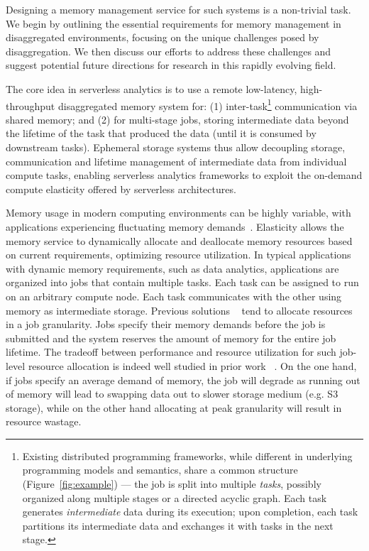 Designing a memory management service for such systems is a non-trivial task. We begin by outlining the essential requirements for memory management in disaggregated environments, focusing on the unique challenges posed by disaggregation. We then discuss our efforts to address these challenges and suggest potential future directions for research in this rapidly evolving field.

The core idea in serverless analytics is to use a remote low-latency, high-throughput disaggregated memory system for: (1) inter-task{\footnote{Existing distributed programming frameworks, while different in underlying programming models and semantics, share a common structure (Figure~\ref{fig:example}) --- the job is split into multiple {\em tasks}, possibly organized along multiple stages or a directed acyclic graph. Each task generates {\em intermediate} data during its execution; upon completion, each task partitions its intermediate data and exchanges it with tasks in the next stage.}} communication via shared memory; and (2) for multi-stage jobs, storing intermediate data beyond the lifetime of the task that produced the data (until it is consumed by downstream tasks). Ephemeral storage systems thus allow decoupling storage, communication and lifetime management of intermediate data from individual compute tasks, enabling serverless analytics frameworks to exploit the on-demand compute elasticity offered by serverless architectures. 

  Memory usage in modern computing environments can be highly variable, with applications experiencing fluctuating memory demands~\cite{jiffy}. Elasticity allows the memory service to dynamically allocate and deallocate memory resources based on current requirements, optimizing resource utilization. In typical applications with dynamic memory requirements, such as data analytics, applications are organized into jobs that contain multiple tasks. Each task can be assigned to run on an arbitrary compute node. Each task communicates with the other using memory as intermediate storage. Previous solutions ~\cite{pocket} tend to allocate resources in a job granularity. Jobs specify their memory demands before the job is submitted and the system reserves the amount of memory for the entire job lifetime. The tradeoff between performance and resource utilization for such job-level resource allocation is indeed well studied in prior work ~\cite{jiffy}. On the one hand, if jobs specify an average demand of memory, the job will degrade as running out of memory will lead to swapping data out to slower storage medium (e.g. S3 storage), while on the other hand allocating at peak granularity will result in resource wastage.

